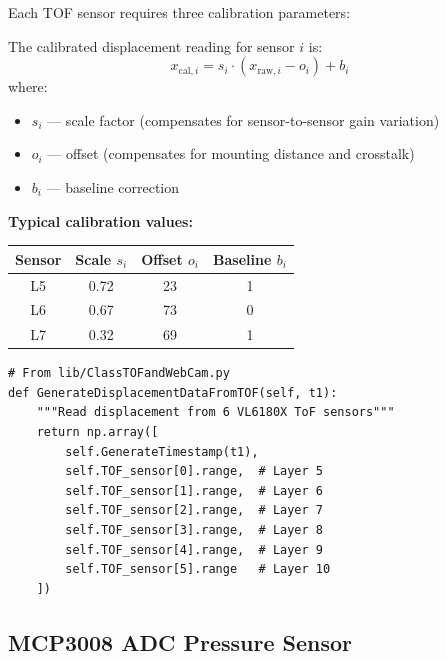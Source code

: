 \documentclass[11pt,a4paper]{article}
\begin{document}
Each TOF sensor requires three calibration parameters:

\begin{equationbox}
The calibrated displacement reading for sensor $i$ is:
\begin{equation}
    x_{\text{cal},i} = s_i \cdot (x_{\text{raw},i} - o_i) + b_i
    \label{eq:tof_cal}
\end{equation}
where:
\begin{itemize}
    \item $s_i$ --- scale factor (compensates for sensor-to-sensor gain variation)
    \item $o_i$ --- offset (compensates for mounting distance and crosstalk)
    \item $b_i$ --- baseline correction
\end{itemize}

\textbf{Typical calibration values:}
\begin{center}
\begin{tabular}{cccc}
\toprule
\textbf{Sensor} & \textbf{Scale $s_i$} & \textbf{Offset $o_i$} & \textbf{Baseline $b_i$} \\
\midrule
L5 & 0.72 & 23 & 1 \\
L6 & 0.67 & 73 & 0 \\
L7 & 0.32 & 69 & 1 \\
\bottomrule
\end{tabular}
\end{center}
\end{equationbox}

\begin{codebox}
\begin{lstlisting}
# From lib/ClassTOFandWebCam.py
def GenerateDisplacementDataFromTOF(self, t1):
    """Read displacement from 6 VL6180X ToF sensors"""
    return np.array([
        self.GenerateTimestamp(t1),
        self.TOF_sensor[0].range,  # Layer 5
        self.TOF_sensor[1].range,  # Layer 6
        self.TOF_sensor[2].range,  # Layer 7
        self.TOF_sensor[3].range,  # Layer 8
        self.TOF_sensor[4].range,  # Layer 9
        self.TOF_sensor[5].range   # Layer 10
    ])
\end{lstlisting}
\end{codebox}

\subsection{MCP3008 ADC Pressure Sensor}
\label{sec:adc}
\end{document}

